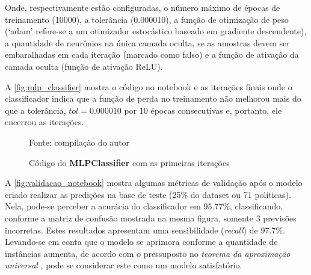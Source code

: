Onde, respectivamente estão configuradas, o número máximo de épocas de treinamento (10000), a tolerância (0.000010), a função de otimização de peso (`adam' refere-se a um otimizador estocástico baseado em gradiente descendente), a quantidade de neurônios na única camada oculta, se as amostras devem ser embaralhadas em cada iteração (marcado como falso) e a função de ativação da camada oculta (função de ativação ReLU).

A \autoref{fig:mlp_classifier} mostra o código no notebook e as iterações finais onde o classificador indica que a função de perda no treinamento não melhorou mais do que a tolerância, $tol = 0.000010$ por 10 épocas consecutivas e, portanto, ele encerrou as iterações.

\begin{figure}[h]
	\centering
	\caption{Código do \textbf{MLPClassifier} com as primeiras iterações}
	
	\label{fig:mlp_classifier}
	{\scriptsize Fonte: compilação do autor}
\end{figure}

A \autoref{fig:validacao_notebook} mostra algumas métricas de validação após o modelo criado realizar as predições na base de teste (25\% do dataset ou 71 políticas). Nela, pode-se perceber a acurácia do classificador em 95.77\%, classificando, conforme a matriz de confusão mostrada na mesma figura, somente 3 previsões incorretas. Estes resultados apresentam uma sensibilidade (\textit{recall}) de 97.7\%. Levando-se em conta que o modelo se aprimora conforme a quantidade de instâncias aumenta, de acordo com o pressuposto no\textit{ teorema da aproximação universal} , pode se considerar este como um modelo satisfatório.

